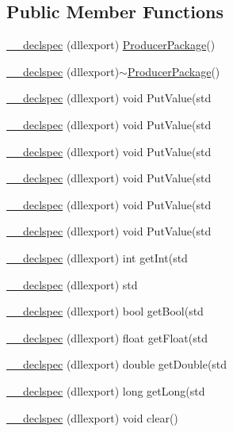 \subsection*{Public Member Functions}
\begin{DoxyCompactItemize}
\item 
\hyperlink{class_producer_package_ae04a98a621fc165f4c6a21a90a462c39}{\-\_\-\-\_\-declspec} (dllexport) \hyperlink{class_producer_package}{Producer\-Package}()
\item 
\hyperlink{class_producer_package_a80f845342ea6b0fff678eb83ec81a1c0}{\-\_\-\-\_\-declspec} (dllexport)$\sim$\hyperlink{class_producer_package}{Producer\-Package}()
\item 
\hyperlink{class_producer_package_ab8110dbdeb12b6d56cfd84c7e724fa74}{\-\_\-\-\_\-declspec} (dllexport) void Put\-Value(std
\item 
\hyperlink{class_producer_package_ab8110dbdeb12b6d56cfd84c7e724fa74}{\-\_\-\-\_\-declspec} (dllexport) void Put\-Value(std
\item 
\hyperlink{class_producer_package_ab8110dbdeb12b6d56cfd84c7e724fa74}{\-\_\-\-\_\-declspec} (dllexport) void Put\-Value(std
\item 
\hyperlink{class_producer_package_ab8110dbdeb12b6d56cfd84c7e724fa74}{\-\_\-\-\_\-declspec} (dllexport) void Put\-Value(std
\item 
\hyperlink{class_producer_package_ab8110dbdeb12b6d56cfd84c7e724fa74}{\-\_\-\-\_\-declspec} (dllexport) void Put\-Value(std
\item 
\hyperlink{class_producer_package_ab8110dbdeb12b6d56cfd84c7e724fa74}{\-\_\-\-\_\-declspec} (dllexport) void Put\-Value(std
\item 
\hyperlink{class_producer_package_a373c5b4768e46f6a3112cc876f51dfd5}{\-\_\-\-\_\-declspec} (dllexport) int get\-Int(std
\item 
\hyperlink{class_producer_package_aa84d2603598a742dba8a3496e7cbefbc}{\-\_\-\-\_\-declspec} (dllexport) std
\item 
\hyperlink{class_producer_package_a9d34fc5ba49d70dd836021b77477cf89}{\-\_\-\-\_\-declspec} (dllexport) bool get\-Bool(std
\item 
\hyperlink{class_producer_package_a221db83e45bf2d09b9797d25162a426c}{\-\_\-\-\_\-declspec} (dllexport) float get\-Float(std
\item 
\hyperlink{class_producer_package_a399c024c0e554336e5c0369dc7d74461}{\-\_\-\-\_\-declspec} (dllexport) double get\-Double(std
\item 
\hyperlink{class_producer_package_a40658b15d517e4f55bee133bad696814}{\-\_\-\-\_\-declspec} (dllexport) long get\-Long(std
\item 
\hyperlink{class_producer_package_a4f6a87b50796da3ed4dcc33fe8a410b9}{\-\_\-\-\_\-declspec} (dllexport) void clear()
\end{DoxyCompactItemize}
